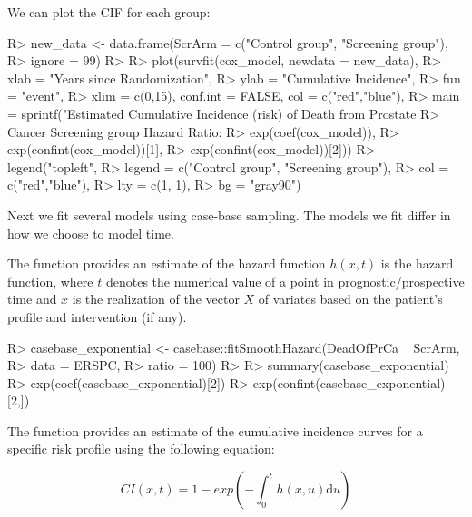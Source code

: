 \documentclass[
]{jss}
\begin{document}
We can plot the CIF for each group:

\begin{CodeChunk}

\begin{CodeInput}
R> new_data <- data.frame(ScrArm = c("Control group", "Screening group"),
R>                        ignore = 99)
R> 
R> plot(survfit(cox_model, newdata = new_data),
R>      xlab = "Years since Randomization", 
R>      ylab = "Cumulative Incidence", 
R>      fun = "event",
R>      xlim = c(0,15), conf.int = FALSE, col = c("red","blue"), 
R>      main = sprintf("Estimated Cumulative Incidence (risk) of Death from Prostate 
R>                     Cancer Screening group Hazard Ratio: %
R>                     exp(coef(cox_model)), 
R>                     exp(confint(cox_model))[1], 
R>                     exp(confint(cox_model))[2]))
R> legend("topleft", 
R>        legend = c("Control group", "Screening group"), 
R>        col = c("red","blue"),
R>        lty = c(1, 1), 
R>        bg = "gray90")
\end{CodeInput}
\end{CodeChunk}

Next we fit several models using case-base sampling. The models we fit
differ in how we choose to model time.

The  function provides an estimate of the hazard
function \(h(x, t)\) is the hazard function, where \(t\) denotes the
numerical value of a point in prognostic/prospective time and \(x\) is
the realization of the vector \(X\) of variates based on the patient's
profile and intervention (if any).

\begin{CodeChunk}

\begin{CodeInput}
R> casebase_exponential <- casebase::fitSmoothHazard(DeadOfPrCa ~ ScrArm, 
R>                                                   data = ERSPC, 
R>                                                   ratio = 100)
R> 
R> summary(casebase_exponential)
R> exp(coef(casebase_exponential)[2])
R> exp(confint(casebase_exponential)[2,])
\end{CodeInput}
\end{CodeChunk}

The  function provides an estimate of the cumulative
incidence curves for a specific risk profile using the following
equation:

\[ CI(x, t) = 1 - exp\left( - \int_0^t h(x, u) \textrm{d}u \right) \]
\end{document}
